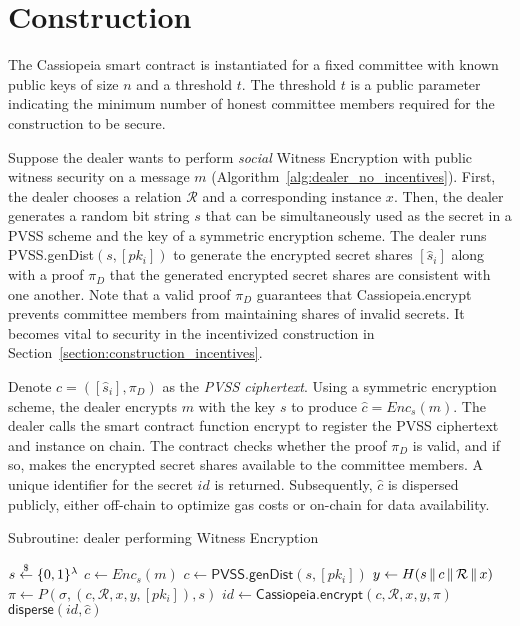 \section{Construction}\label{section:construction_without_incentives}
The Cassiopeia smart contract is instantiated for a fixed committee with known public keys of size $n$ and a threshold $t$.
The threshold $t$ is a public parameter indicating the minimum number of honest committee members required for the construction to be secure.

Suppose the dealer wants to perform \emph{social} Witness Encryption with public witness security on a message $m$ (Algorithm~\ref{alg:dealer_no_incentives}).
First, the dealer chooses a relation $\mathcal{R}$ and a corresponding instance $x$.
Then, the dealer generates a random bit string $s$ that can be simultaneously used as the secret in a PVSS scheme and the key of a symmetric encryption scheme. %
The dealer runs \textsf{PVSS.genDist}$(s, [pk_i])$ to generate the encrypted secret shares $[\hat{s}_i]$ along with a proof $\pi_D$ that the generated encrypted secret shares are consistent with one another.
Note that a valid proof $\pi_D$ guarantees that \textsf{Cassiopeia.encrypt} prevents committee members from maintaining shares of invalid secrets.
It becomes vital to security in the incentivized construction in Section~\ref{section:construction_incentives}.

Denote $c = ([\hat{s}_i], \pi_D)$ as the \emph{PVSS ciphertext}.
Using a symmetric encryption scheme, the dealer encrypts $m$ with the key $s$ to produce $\hat{c} = Enc_s(m)$.
The dealer calls the smart contract function \textsf{encrypt} to register the PVSS ciphertext and instance on chain.
The contract checks whether the proof $\pi_D$ is valid, and if so, makes the encrypted secret shares available to the committee members. 
A unique identifier for the secret $id$ is returned.
Subsequently, $\hat{c}$ is dispersed publicly, either off-chain to optimize gas costs or on-chain for data availability.

\begin{algorithm}[h]
\caption{Subroutine: dealer performing Witness Encryption}
\label{alg:dealer_no_incentives}
    \begin{algorithmic}[1]
            \State $s \overset{\$}{\gets} \{0,1\}^{\lambda}$
            \State $\hat{c} \gets Enc_s(m)$
            \State $c \gets \textsf{PVSS.genDist}(s, [pk_i])$
            \State $y \gets H(s \,\|\, c \,\|\, \mathcal{R} \,\|\, x)$
            \State $\pi \gets P(\sigma, (c, \mathcal{R}, x, y, [pk_i]), s)$
            \State $id \gets \textsf{Cassiopeia.encrypt}(c, \mathcal{R}, x, y, \pi)$
            \State $\textsf{disperse}(id, \hat{c})$ %
        \EndFunction
    \end{algorithmic}
\end{algorithm}

